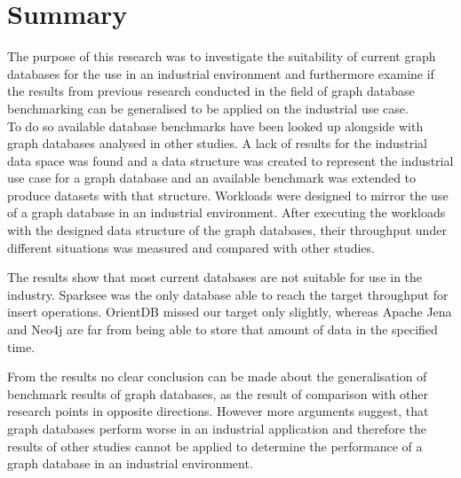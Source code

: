 \section{Summary}
The purpose of this research was to investigate the suitability of current graph databases for the use in an industrial environment and furthermore examine if the results from previous research conducted in the field of graph database benchmarking can be generalised to be applied on the industrial use case.\\
To do so available database benchmarks have been looked up alongside with graph databases analysed in other studies.
A lack of results for the industrial data space was found and a data structure was created to represent the industrial use case for a graph database and an available benchmark was extended to produce datasets with that structure.
Workloads were designed to mirror the use of a graph database in an industrial environment.
After executing the workloads with the designed data structure of the graph databases,
their throughput under different situations was measured and compared with other studies.

The results show that most current databases are not suitable for use in the industry.
Sparksee was the only database able to reach the target throughput for insert operations.
OrientDB missed our target only slightly,
whereas Apache Jena and Neo4j are far from being able to store that amount of data in the specified time.

From the results no clear conclusion can be made about the generalisation of benchmark results of graph databases,
as the result of comparison with other research points in opposite directions.
However more arguments suggest,
that graph databases perform worse in an industrial application and therefore the results of other studies cannot be applied to determine the performance of a graph database in an industrial environment.
